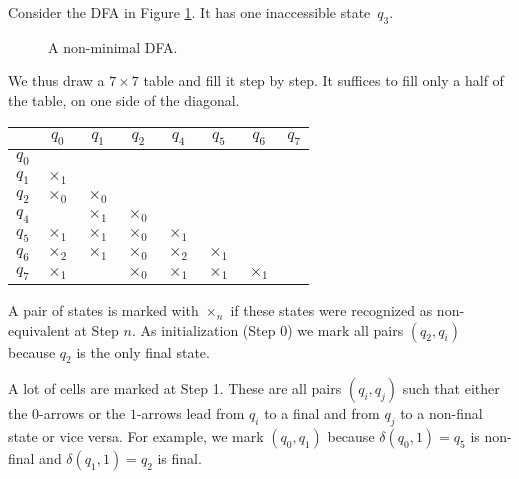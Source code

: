\begin{exl}
Consider the DFA in Figure \ref{fig:DFAMinim}.
It has one inaccessible state~$q_3$.

\begin{figure}[ht]
\begin{center}

\end{center}
\caption{A non-minimal DFA.}
\label{fig:DFAMinim}
\end{figure}

We thus draw a $7 \times 7$ table and fill it step by step.
It suffices to fill only a half of the table, on one side of the diagonal.

\renewcommand{\arraystretch}{1.7}
\begin{center}
\begin{tabular}{c|c|c|c|c|c|c|c|}
& $q_0$ & $q_1$ & $q_2$ & $q_4$ & $q_5$ & $q_6$ & $q_7$\\\hline
$q_0$ & \cellcolor{lightgray} &&&&&&\\\hline
$q_1$ & $\times_1$ & \cellcolor{lightgray} &&&&&\\\hline
$q_2$ & $\times_0$ & $\times_0$ & \cellcolor{lightgray} &&&&\\\hline
$q_4$ &  & $\times_1$ & $\times_0$ & \cellcolor{lightgray} &&&\\\hline
$q_5$ & $\times_1$ & $\times_1$ & $\times_0$ & $\times_1$ & \cellcolor{lightgray} &&\\\hline
$q_6$ & $\times_2$ & $\times_1$ & $\times_0$ & $\times_2$ & $\times_1$ & \cellcolor{lightgray} &\\\hline
$q_7$ & $\times_1$ &  & $\times_0$ & $\times_1$ & $\times_1$ & $\times_1$ & \cellcolor{lightgray}\\\hline
\end{tabular}
\end{center}

A pair of states is marked with $\times_n$ if these states were recognized as non-equivalent at Step $n$.
As initialization (Step 0) we mark all pairs $(q_2, q_i)$ because $q_2$ is the only final state.

A lot of cells are marked at Step 1.
These are all pairs $(q_i, q_j)$ such that either the $0$-arrows or the $1$-arrows lead from $q_i$ to a final and from $q_j$ to a non-final state or vice versa.
For example, we mark $(q_0, q_1)$ because $\delta(q_0, 1) = q_5$ is non-final and $\delta(q_1, 1) = q_2$ is final.


\end{exl}
